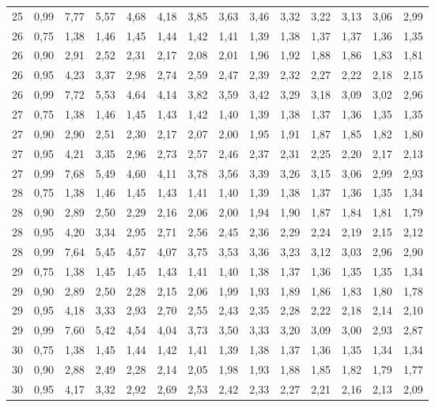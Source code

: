 \documentclass[
]{article}
\begin{document}
\begin{landscape}
\begin{longtable}[t]{cccccccccccccc}
25 & 0,99 & 7,77 & 5,57 & 4,68 & 4,18 & 3,85 & 3,63 & 3,46 & 3,32 & 3,22 & 3,13 & 3,06 & 2,99\\
26 & 0,75 & 1,38 & 1,46 & 1,45 & 1,44 & 1,42 & 1,41 & 1,39 & 1,38 & 1,37 & 1,37 & 1,36 & 1,35\\
26 & 0,90 & 2,91 & 2,52 & 2,31 & 2,17 & 2,08 & 2,01 & 1,96 & 1,92 & 1,88 & 1,86 & 1,83 & 1,81\\
26 & 0,95 & 4,23 & 3,37 & 2,98 & 2,74 & 2,59 & 2,47 & 2,39 & 2,32 & 2,27 & 2,22 & 2,18 & 2,15\\
26 & 0,99 & 7,72 & 5,53 & 4,64 & 4,14 & 3,82 & 3,59 & 3,42 & 3,29 & 3,18 & 3,09 & 3,02 & 2,96\\
27 & 0,75 & 1,38 & 1,46 & 1,45 & 1,43 & 1,42 & 1,40 & 1,39 & 1,38 & 1,37 & 1,36 & 1,35 & 1,35\\
27 & 0,90 & 2,90 & 2,51 & 2,30 & 2,17 & 2,07 & 2,00 & 1,95 & 1,91 & 1,87 & 1,85 & 1,82 & 1,80\\
27 & 0,95 & 4,21 & 3,35 & 2,96 & 2,73 & 2,57 & 2,46 & 2,37 & 2,31 & 2,25 & 2,20 & 2,17 & 2,13\\
27 & 0,99 & 7,68 & 5,49 & 4,60 & 4,11 & 3,78 & 3,56 & 3,39 & 3,26 & 3,15 & 3,06 & 2,99 & 2,93\\
28 & 0,75 & 1,38 & 1,46 & 1,45 & 1,43 & 1,41 & 1,40 & 1,39 & 1,38 & 1,37 & 1,36 & 1,35 & 1,34\\
28 & 0,90 & 2,89 & 2,50 & 2,29 & 2,16 & 2,06 & 2,00 & 1,94 & 1,90 & 1,87 & 1,84 & 1,81 & 1,79\\
28 & 0,95 & 4,20 & 3,34 & 2,95 & 2,71 & 2,56 & 2,45 & 2,36 & 2,29 & 2,24 & 2,19 & 2,15 & 2,12\\
28 & 0,99 & 7,64 & 5,45 & 4,57 & 4,07 & 3,75 & 3,53 & 3,36 & 3,23 & 3,12 & 3,03 & 2,96 & 2,90\\
29 & 0,75 & 1,38 & 1,45 & 1,45 & 1,43 & 1,41 & 1,40 & 1,38 & 1,37 & 1,36 & 1,35 & 1,35 & 1,34\\
29 & 0,90 & 2,89 & 2,50 & 2,28 & 2,15 & 2,06 & 1,99 & 1,93 & 1,89 & 1,86 & 1,83 & 1,80 & 1,78\\
29 & 0,95 & 4,18 & 3,33 & 2,93 & 2,70 & 2,55 & 2,43 & 2,35 & 2,28 & 2,22 & 2,18 & 2,14 & 2,10\\
29 & 0,99 & 7,60 & 5,42 & 4,54 & 4,04 & 3,73 & 3,50 & 3,33 & 3,20 & 3,09 & 3,00 & 2,93 & 2,87\\
30 & 0,75 & 1,38 & 1,45 & 1,44 & 1,42 & 1,41 & 1,39 & 1,38 & 1,37 & 1,36 & 1,35 & 1,34 & 1,34\\
30 & 0,90 & 2,88 & 2,49 & 2,28 & 2,14 & 2,05 & 1,98 & 1,93 & 1,88 & 1,85 & 1,82 & 1,79 & 1,77\\
30 & 0,95 & 4,17 & 3,32 & 2,92 & 2,69 & 2,53 & 2,42 & 2,33 & 2,27 & 2,21 & 2,16 & 2,13 & 2,09\\

\end{longtable}
\end{landscape}
\end{document}
